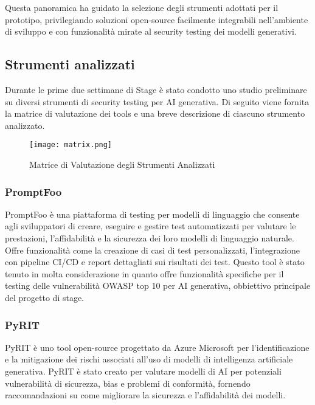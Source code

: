 Questa panoramica ha guidato la selezione degli strumenti adottati per il prototipo, privilegiando soluzioni open-source facilmente integrabili nell'ambiente di sviluppo e con funzionalità mirate al security testing dei modelli generativi.

\subsection{Strumenti analizzati}
Durante le prime due settimane di Stage è stato condotto uno studio preliminare su diversi strumenti di security testing per AI generativa. Di seguito viene fornita la matrice di valutazione dei tools e una breve descrizione di ciascuno strumento analizzato.

\begin{figure}[!h]
    \centering
    \texttt{[image: matrix.png]}
    \caption{Matrice di Valutazione degli Strumenti Analizzati}
\end{figure}

\subsubsection*{PromptFoo}
PromptFoo è una piattaforma di testing per modelli di linguaggio che consente agli sviluppatori di creare, eseguire e gestire test automatizzati per valutare le prestazioni, l'affidabilità e la sicurezza dei loro modelli di linguaggio naturale. Offre funzionalità come la creazione di casi di test personalizzati, l'integrazione con pipeline CI/CD e report dettagliati sui risultati dei test.
Questo tool è stato tenuto in molta considerazione in quanto offre funzionalità specifiche per il testing delle vulnerabilità OWASP top 10 per AI generativa, obbiettivo principale del progetto di stage.

\subsubsection*{PyRIT}
PyRIT è uno tool open-source progettato da Azure Microsoft per l'identificazione e la mitigazione dei rischi associati all'uso di modelli di intelligenza artificiale generativa. PyRIT è stato creato per valutare modelli di AI per potenziali vulnerabilità di sicurezza, bias e problemi di conformità, fornendo raccomandazioni su come migliorare la sicurezza e l'affidabilità dei modelli.\\


